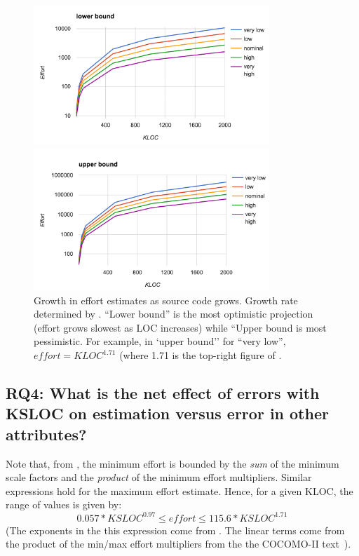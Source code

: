 \begin{figure}[!t] 
\includegraphics[width=3.5in]{Figs/lower.png}


\includegraphics[width=3.5in]{Figs/upper.png} 
\caption{Growth in effort estimates as source code grows. Growth rate determined by . 
``Lower bound'' is the most optimistic projection (effort grows slowest as LOC increases)
while ``Upper bound is most pessimistic.
For example, in `upper bound'' for ``very low'', $\mathit{effort} = \mathit{KLOC}^{1.71}$ (where 1.71 is the top-right figure of . }\label{fig:lowerupper}
\end{figure}
 


\subsection{RQ4: What is the net effect of errors with KSLOC on estimation
versus error in other attributes?}\label{sect:rq4}


Note that, from ,
the minimum  
effort  is bounded by the  {\em sum} of the minimum scale factors
and the {\em product} of the minimum effort multipliers.
Similar expressions hold for the  maximum effort estimate. Hence,
for a given KLOC, the range of values is given by:
\[
0.057*\mathit{KSLOC}^{0.97}  \le \mathit{effort} \le 115.6*\mathit{KSLOC}^{1.71}\]
(The exponents in the this expression come from . The linear terms come
from the product of the min/max effort multipliers from the 
the COCOMO-II text~\cite{boehm00b}).

